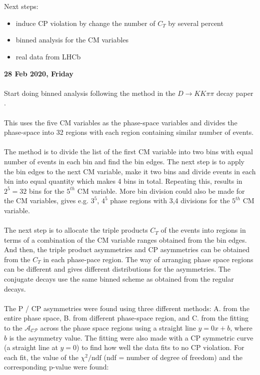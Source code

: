 \\
\\
Next steps:
\begin{itemize}
    \item induce CP violation by change the number of $C_T$ by several percent
    \item binned analysis for the CM variables
    \item real data from LHCb
\end{itemize}
\clearpage
\noindent\textbf{28 Feb 2020, Friday}
\\
\\
Start doing binned analysis following the method in the $D\to KK\pi\pi$ decay paper \autocite{Aaij_2014}.
\\
\\
This uses the five CM variables as the phase-space variables and divides the phase-space into 32 regions with each region containing similar number of events. 
\\
\\
The method is to divide the list of the first CM variable into two bins with equal number of events in each bin and find the bin edges. The next step is to apply the bin edges to the next CM variable, make it two bins and divide events in each bin into equal quantity which makes 4 bins in total. Repeating this, results in $2^5=32$ bins for the $5^{th}$ CM variable. More bin division could also be made for the CM variables, gives e.g. $3^5$, $4^5$ phase regions with 3,4 divisions for the $5^{th}$ CM variable.
\\
\\
The next step is to allocate the triple products $C_T$ of the events into regions in terms of a combination of the CM variable ranges obtained from the bin edges. And then, the triple product asymmetries and CP asymmetries can be obtained from the $C_T$ in each phase-pace region. The way of arranging phase space regions can be different and gives different distributions for the asymmetries. The conjugate decays use the same binned scheme as obtained from the regular decays.
\\
\\
The P / CP asymmetries were found using three different methods: A. from the entire phase space, B. from different phase-space region, and C. from the fitting to the $\mathcal{A}_{\mathcal{C}\mathcal{P}}$ across the phase space regions using a straight line $y=0x+b$, where $b$ is the asymmetry value. The fitting were also made with a CP symmetric curve (a straight line at $y=0$) to find how well the data fits to no CP violation. For each fit, the value of the $\chi^2/\text{ndf}$ (ndf = number of degree of freedom) and the corresponding p-value were found:
